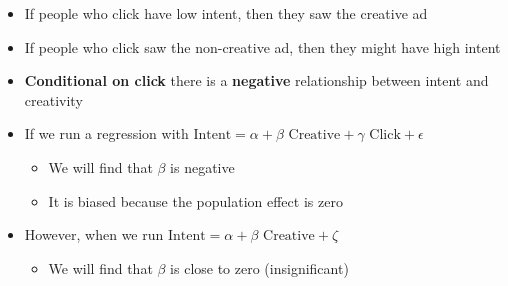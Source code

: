 \documentclass[10pt]{article}
\begin{document}
\begin{itemize}
\begin{itemize}
\begin{center}
        \end{center}
        \item Controlling for click will bias an estimated relationship between ad creative and intent $\to $ \textbf{collider bias}
    \end{itemize}
    \item If people who click have low intent, then they saw the creative ad 
    \item If people who click saw the non-creative ad, then they might have high intent 
    \item \textbf{Conditional on click} there is a \textbf{negative} relationship between intent and creativity
    \item If we run a regression with $\text{Intent} = \alpha + \beta\text{ Creative} + \gamma\text{ Click} + \epsilon $
    \begin{itemize}
        \item We will find that $\beta $ is negative 
        \item It is biased because the population effect is zero
    \end{itemize}
    \item However, when we run $\text{Intent} = \alpha + \beta\text{ Creative} + \zeta $
    \begin{itemize}
        \item We will find that $\beta $ is close to zero (insignificant)
    \end{itemize}
\end{itemize}
\end{document}
